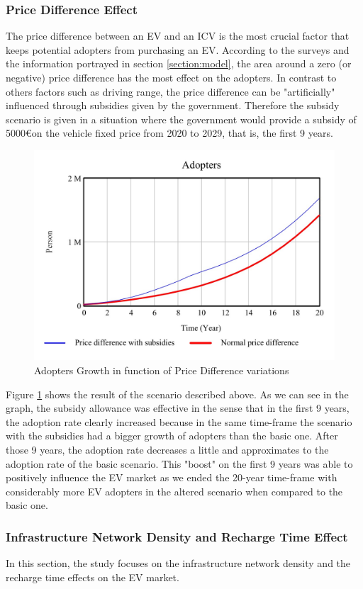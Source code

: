 \subsubsection{Price Difference Effect}
The price difference between an EV and an ICV is the most crucial factor that keeps potential adopters from purchasing an EV. According to the surveys and the information portrayed in section \ref{section:model}, the area around a zero (or negative) price difference has the most effect on the adopters. In contrast to others factors such as driving range, the price difference can be "artificially" influenced through subsidies given by the government. Therefore the subsidy scenario is given in a situation where the government would provide a subsidy of 5000\euro \space on the vehicle fixed price from 2020 to 2029, that is, the first 9 years.

\begin{figure}[htbp]
\centerline{\includegraphics[width=0.7\linewidth]{img/results-price-difference.jpg}}
\caption{Adopters Growth in function of Price Difference variations}
\label{fig:results-price-difference}
\end{figure}

Figure \ref{fig:results-price-difference} shows the result of the scenario described above. As we can see in the graph, the subsidy allowance was effective in the sense that in the first 9 years, the adoption rate clearly increased because in the same time-frame the scenario with the subsidies had a bigger growth of adopters than the basic one. After those 9 years, the adoption rate decreases a little and approximates to the adoption rate of the basic scenario. This "boost" on the first 9 years was able to positively influence the EV market as we ended the 20-year time-frame with considerably more EV adopters in the altered scenario when compared to the basic one. 

\subsubsection{Infrastructure Network Density and Recharge Time Effect}
In this section, the study focuses on the infrastructure network density and the recharge time effects on the EV market.

